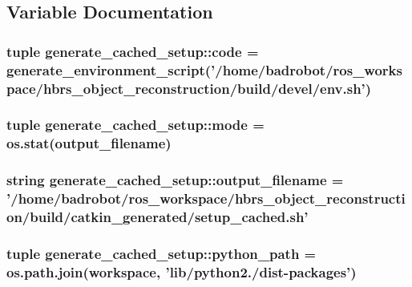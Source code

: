 \subsection{\-Variable \-Documentation}
\hypertarget{namespacegenerate__cached__setup_addcec96a295a686731bd38e0d17c22fa}{
\subsubsection[{code}]{\setlength{\rightskip}{0pt plus 5cm}tuple {\bf generate\-\_\-cached\-\_\-setup\-::code} = generate\-\_\-environment\-\_\-script('/home/badrobot/ros\-\_\-workspace/hbrs\-\_\-object\-\_\-reconstruction/build/devel/env.\-sh')}}\label{namespacegenerate__cached__setup_addcec96a295a686731bd38e0d17c22fa}
\hypertarget{namespacegenerate__cached__setup_ab69771980c7a74aa5a3c182fe4bf16d8}{
\subsubsection[{mode}]{\setlength{\rightskip}{0pt plus 5cm}tuple {\bf generate\-\_\-cached\-\_\-setup\-::mode} = os.\-stat({\bf output\-\_\-filename})}}\label{namespacegenerate__cached__setup_ab69771980c7a74aa5a3c182fe4bf16d8}
\hypertarget{namespacegenerate__cached__setup_ab8af5b5c03c4c054bff5d246d632a5d8}{
\subsubsection[{output\-\_\-filename}]{\setlength{\rightskip}{0pt plus 5cm}string {\bf generate\-\_\-cached\-\_\-setup\-::output\-\_\-filename} = '/home/badrobot/ros\-\_\-workspace/hbrs\-\_\-object\-\_\-reconstruction/build/catkin\-\_\-generated/setup\-\_\-cached.\-sh'}}\label{namespacegenerate__cached__setup_ab8af5b5c03c4c054bff5d246d632a5d8}
\hypertarget{namespacegenerate__cached__setup_ac7cb1f0b129964a1aeec5a473feffaf7}{
\subsubsection[{python\-\_\-path}]{\setlength{\rightskip}{0pt plus 5cm}tuple {\bf generate\-\_\-cached\-\_\-setup\-::python\-\_\-path} = os.\-path.\-join(workspace, 'lib/python2./dist-\/packages')}}\label{namespacegenerate__cached__setup_ac7cb1f0b129964a1aeec5a473feffaf7}
